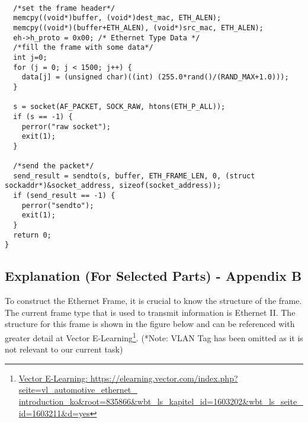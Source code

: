 \documentclass[a4paper,12pt]{article}
\begin{document}
\begin{verbatim}
  
  /*set the frame header*/
  memcpy((void*)buffer, (void*)dest_mac, ETH_ALEN);
  memcpy((void*)(buffer+ETH_ALEN), (void*)src_mac, ETH_ALEN);
  eh->h_proto = 0x00; /* Ethernet Type Data */
  /*fill the frame with some data*/
  int j=0;
  for (j = 0; j < 1500; j++) {
    data[j] = (unsigned char)((int) (255.0*rand()/(RAND_MAX+1.0)));
  }
  
  s = socket(AF_PACKET, SOCK_RAW, htons(ETH_P_ALL));
  if (s == -1) {
    perror("raw socket");
    exit(1);
  }
  
  /*send the packet*/
  send_result = sendto(s, buffer, ETH_FRAME_LEN, 0, (struct sockaddr*)&socket_address, sizeof(socket_address));
  if (send_result == -1) {
    perror("sendto");
    exit(1);
  }
  return 0;
}
\end{verbatim}
\restoregeometry

\subsection{Explanation (For Selected Parts) - Appendix B}
To construct the Ethernet Frame, it is crucial to know the structure of the frame. The current frame type that is used to transmit information is Ethernet II. The structure for this frame is shown in the figure below and can be referenced with greater detail at Vector E-Learning\footnote{\href{https://elearning.vector.com/index.php?seite=vl_automotive_ethernet_introduction_ko\&root=835866\&wbt_ls_kapitel_id=1603202\&wbt_ls_seite_id=1603211\&d=yes}{Vector E-Learning: https://elearning.vector.com/index.php?seite=vl\_automotive\_ethernet\_\\introduction\_ko\&root=835866\&wbt\_ls\_kapitel\_id=1603202\&wbt\_ls\_seite\_id=1603211\&d=yes}}. (*Note: VLAN Tag has been omitted as it is not relevant to our current task)
\end{document}
